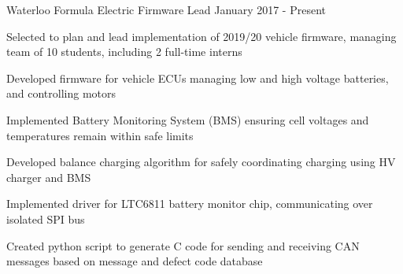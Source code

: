 

\begin{cventries}
  \cventrytwo
    {Waterloo Formula Electric} %
    {Firmware Lead} %
    {} %
    {January 2017 - Present} %
    {
      \begin{cvitems}
        \item {Selected to plan and lead implementation of 2019/20 vehicle firmware, managing team of 10 students, including 2 full-time interns}
        \item {Developed firmware for vehicle ECUs managing low and high voltage batteries, and controlling motors}
        \item {Implemented Battery Monitoring System (BMS) ensuring cell voltages and temperatures remain within safe limits}
        \item {Developed balance charging algorithm for safely coordinating charging using HV charger and BMS}
        \item {Implemented driver for LTC6811 battery monitor chip, communicating over isolated SPI bus}
        \item {Created python script to generate C code for sending and receiving CAN messages based on message and defect code database}
      \end{cvitems}
    }


\end{cventries}
